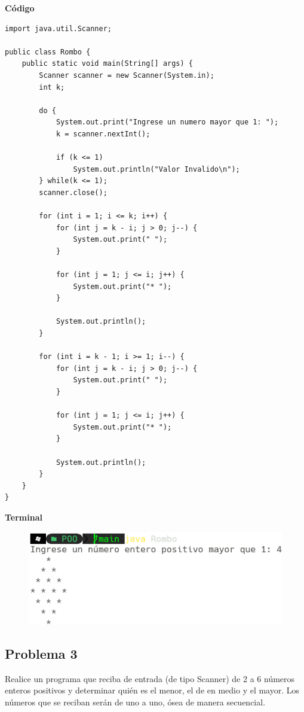 \documentclass[11pt, twocolumn]{article}
\begin{document}
    \textbf{Código}
    \begin{lstlisting}
import java.util.Scanner;

public class Rombo {
    public static void main(String[] args) {
        Scanner scanner = new Scanner(System.in);
        int k;

        do {
            System.out.print("Ingrese un numero mayor que 1: ");
            k = scanner.nextInt();
            
            if (k <= 1) 
                System.out.println("Valor Invalido\n");
        } while(k <= 1);
        scanner.close();
        
        for (int i = 1; i <= k; i++) {
            for (int j = k - i; j > 0; j--) {
                System.out.print(" ");
            }
            
            for (int j = 1; j <= i; j++) {
                System.out.print("* ");
            }
            
            System.out.println();
        }
        
        for (int i = k - 1; i >= 1; i--) {
            for (int j = k - i; j > 0; j--) {
                System.out.print(" ");
            }
            
            for (int j = 1; j <= i; j++) {
                System.out.print("* ");
            }
            
            System.out.println();
        }
    }
}
    \end{lstlisting}

    \textbf{Terminal}
    \begin{figure}[ht]
        \includegraphics[width=0.75\columnwidth, center]{P2.png}
    \end{figure}

    \subsection*{Problema 3}
    Realice un programa que reciba de entrada (de tipo Scanner) de 2 a 6 números enteros positivos y determinar quién es el menor, el de en medio y el mayor. Los números que se reciban serán de uno a uno, ósea de manera secuencial.
\end{document}
